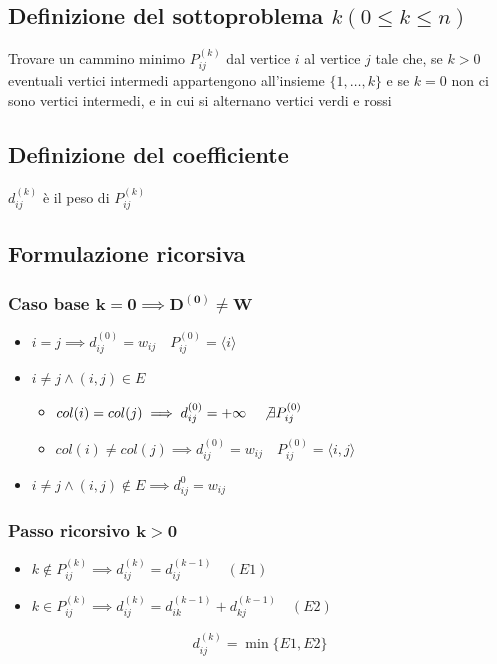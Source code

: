 \subsection{Definizione del sottoproblema $k(0 \leq k \leq n)$}
Trovare un cammino minimo $P_{ij}^{(k)}$ dal vertice $i$ al vertice $j$ tale che, se $k>0$ eventuali vertici intermedi appartengono all'insieme $\{1,\dots,k\}$ e se $k=0$ non ci sono vertici intermedi, e in cui si alternano vertici verdi e rossi

\subsection{Definizione del coefficiente}

$d_{ij}^{(k)}$ è il peso di $P_{ij}^{(k)}$

\subsection{Formulazione ricorsiva}

\subsubsection{Caso base $\mathbf{k=0 \implies D^{(0)} \not = W}$}
\begin{itemize}
    \item $i = j \implies d_{ij}^{(0)} = w_{ij} \quad P_{ij}^{(0)} = \langle i \rangle$
    
    \item $i \not = j \land (i,j) \in E$
    \begin{itemize}
        \item $col(i) = col(j) \implies d_{ij}^{(0)} = +\infty \quad \not \exists P_{ij}^{(0)}$
        \item $col(i) \not = col(j) \implies d_{ij}^{(0)} = w_{ij} \quad P^{(0)}_{ij} = \langle i,j \rangle$
    \end{itemize}

    \item $i \not = j \land (i,j) \not \in E \implies d_{ij}^{0} = w_{ij}$
\end{itemize}

\subsubsection{Passo ricorsivo $\mathbf{k>0}$}
\begin{itemize}
    \item $k \not \in P_{ij}^{(k)} \implies d_{ij}^{(k)} = d_{ij}^{(k-1)} \quad (E1)$
    \item $k \in P_{ij}^{(k)} \implies d_{ij}^{(k)} = d_{ik}^{(k-1)} + d_{kj}^{(k-1)} \quad (E2)$
\end{itemize}
{
    \large
    $$
    d_{ij}^{(k)} = \min\{E1,E2\}
    $$
}
